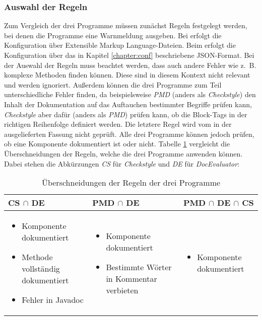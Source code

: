 \subsubsection{Auswahl der Regeln}
Zum Vergleich der drei Programme müssen zunächst Regeln festgelegt werden, bei denen die Programme eine Warnmeldung ausgeben. Bei \checkpmd{} erfolgt die Konfiguration über  Extensible Markup Language-Dateien. Beim \doceval erfolgt die Konfiguration über das in Kapitel \ref{chapter:conf} beschriebene \ac{JSON}-Format. Bei der Auswahl der Regeln muss beachtet werden, dass \checkpmd auch andere Fehler wie z.~B. komplexe Methoden finden können. Diese sind in diesem Kontext nicht relevant und werden ignoriert. Außerdem können die drei Programme zum Teil unterschiedliche Fehler finden, da beispielsweise \textit{PMD} (anders als \textit{Checkstyle}) den Inhalt der Dokumentation auf das Auftauchen bestimmter Begriffe prüfen kann, \textit{Checkstyle} aber dafür (anders als \textit{PMD}) prüfen kann, ob die Block-Tags in der richtigen Reihenfolge definiert werden. Die letztere Regel wird vom \doceval in der ausgelieferten Fassung nicht geprüft. Alle drei Programme können jedoch prüfen, ob eine Komponente dokumentiert ist oder nicht. Tabelle \ref{tab:inters_rules} vergleicht die Überschneidungen der Regeln, welche die drei Programme anwenden können. Dabei stehen die Abkürzungen \textit{CS} für \textit{Checkstyle} und \textit{DE} für \textit{DocEvaluator}:

\begin{table}[]
    \centering
    \begin{tabular}{m{4.5cm}|m{4.5cm}|m{4.5cm}}
     \textbf{CS} $\cap$ \textbf{DE}  & \textbf{PMD} $\cap$ \textbf{DE} & \textbf{PMD} $\cap$ \textbf{DE} $\cap$  \textbf{CS}  \\\hline
     \begin{itemize}
        \item Komponente dokumentiert
        \item Methode vollständig dokumentiert
         \item Fehler in Javadoc
     \end{itemize}
      & 
      \begin{itemize}
          \item  Komponente dokumentiert

          \item Bestimmte Wörter in Kommentar verbieten
      \end{itemize}
      & 
       \begin{itemize}
          \item  Komponente dokumentiert
         
      \end{itemize}
      \\\hline
    \end{tabular}
    \caption{Überschneidungen der Regeln der drei Programme}
    \label{tab:inters_rules}
\end{table}

